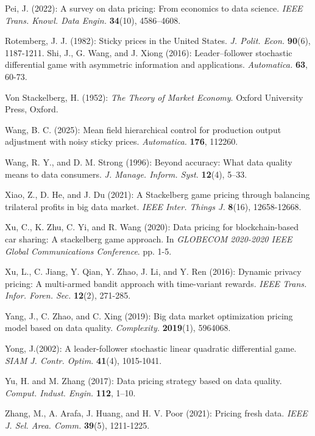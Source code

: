 \documentclass[11pt]{article}
\numberwithin{equation}{section}
\begin{document}
\begin{thebibliography}{}
{		
		Pei, J. (2022): A survey on data pricing: From economics to data science. {\it IEEE Trans. Knowl. Data Engin.} {\bf 34}(10), 4586–4608.

        Rotemberg, J. J. (1982): Sticky prices in the United States. {\it J. Polit. Econ.} {\bf 90}(6), 1187-1211.
		Shi, J., G. Wang, and J. Xiong (2016): Leader–follower stochastic differential game with asymmetric information and applications. {\it Automatica.} {\bf 63}, 60-73.
		
		Von Stackelberg, H. (1952): {\it The Theory of Market Economy}. Oxford University Press, Oxford.
		
		Wang, B. C. (2025): Mean field hierarchical control for production output adjustment with noisy sticky prices. {\it Automatica.} {\bf 176}, 112260.
		
		Wang, R. Y., and D. M. Strong (1996): Beyond accuracy: What data quality means to data consumers. {\it J. Manage. Inform. Syst.} {\bf 12}(4), 5–33. 
		
		Xiao, Z., D. He, and J. Du (2021): A Stackelberg game pricing through balancing trilateral profits in big data market. {\it IEEE Inter. Things J.} {\bf 8}(16), 12658-12668.
		
		Xu, C., K. Zhu, C. Yi, and R. Wang (2020): Data pricing for blockchain-based car sharing: A stackelberg game approach. In
		{\it GLOBECOM 2020-2020 IEEE Global Communications Conference}. pp. 1-5.
		
		Xu, L., C. Jiang, Y. Qian, Y. Zhao, J. Li, and Y. Ren (2016): Dynamic privacy pricing: A multi-armed bandit approach with time-variant rewards. {\it IEEE Trans. Infor. Foren. Sec.} {\bf 12}(2), 271-285.
		
		Yang, J., C. Zhao, and C. Xing (2019): Big data market optimization pricing model based on data quality. {\it Complexity.} {\bf 2019}(1), 5964068.
		
		Yong, J.(2002): A leader-follower stochastic linear quadratic differential game. {\it SIAM J. Contr. Optim.} {\bf 41}(4), 1015-1041.
		
		Yu, H. and  M. Zhang (2017): Data pricing strategy based on data quality. {\it Comput. Indust. Engin.} {\bf 112}, 1–10.
		
		Zhang, M., A. Arafa, J. Huang, and H. V. Poor (2021): Pricing fresh data. {\it IEEE J. Sel. Area. Comm.} {\bf 39}(5), 1211-1225.
		
	}	
		
		
	\end{thebibliography}
\end{document}
